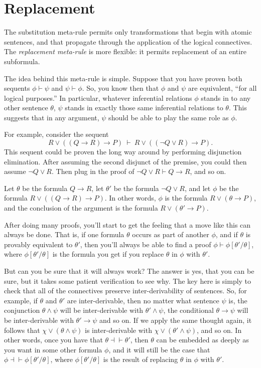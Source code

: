\section{Replacement} \label{replacement}

The substitution meta-rule permits only transformations that begin
with atomic sentences, and that propagate through the application of
the logical connectives.  The \emph{replacement meta-rule} is more
flexible: it permits replacement of an entire subformula.

The idea behind this meta-rule is simple.  Suppose that you have
proven both sequents $\phi\vdash\psi$ and $\psi\vdash\phi$.  So, you
know then that $\phi$ and $\psi$ are equivalent, ``for all logical
purposes.''  In particular, whatever inferential relations $\phi$
stands in to any other sentence $\theta$, $\psi$ stands in exactly
those same inferential relations to $\theta$.  This suggests that in
any argument, $\psi$ should be able to play the same role as $\phi$.

For example, consider the sequent
\[ R\vee ((Q\to R)\to P) \: \vdash \: R\vee ((\neg Q\vee R)\to P) .\]
This sequent could be proven the long way around by performing
disjunction elimination.  After assuming the second disjunct of the
premise, you could then assume $\neg Q\vee R$.  Then plug in the proof
of $\neg Q\vee R\vdash Q\to R$, and so on.

Let $\theta$ be the formula $Q\to R$, let $\theta '$ be the formula
$\neg Q\vee R$, and let $\phi$ be the formula $R\vee ((Q\to R)\to P)$.
In other words, $\phi$ is the formula $R\vee (\theta \to P)$, and the
conclusion of the argument is the formula $R\vee (\theta '\to P)$.

After doing many proofs, you'll start to get the feeling that a move
like this can always be done.  That is, if one formula $\theta$ occurs
as part of another $\phi$, and if $\theta$ is provably equivalent to
$\theta '$, then you'll always be able to find a proof $\phi\vdash\phi
[\theta '/\theta ]$, where $\phi [\theta '/\theta ]$ is the formula
you get if you replace $\theta$ in $\phi$ with $\theta '$.

But can you be sure that it will always work?  The answer is yes, that
you can be sure, but it takes some patient verification to see why.
The key here is simply to check that all of the connectives preserve
inter-derivability of sentences.  So, for example, if $\theta$ and
$\theta '$ are inter-derivable, then no matter what sentence $\psi$
is, the conjunction $\theta\wedge\psi$ will be inter-derivable with
$\theta' \wedge\psi$, the conditional $\theta\to\psi$ will be
inter-derivable with $\theta'\to\psi$ and so on.  If we apply the same
thought again, it follows that $\chi\vee (\theta\wedge\psi )$ is
inter-derivable with $\chi\vee (\theta '\wedge\psi )$, and so on.  In
other words, once you have that $\theta\dashv\vdash\theta '$, then
$\theta$ can be embedded as deeply as you want in some other formula
$\phi$, and it will still be the case that $\phi\dashv\vdash \phi
[\theta '/\theta ]$, where $\phi [\theta '/\theta ]$ is the result of
replacing $\theta$ in $\phi$ with $\theta '$.

